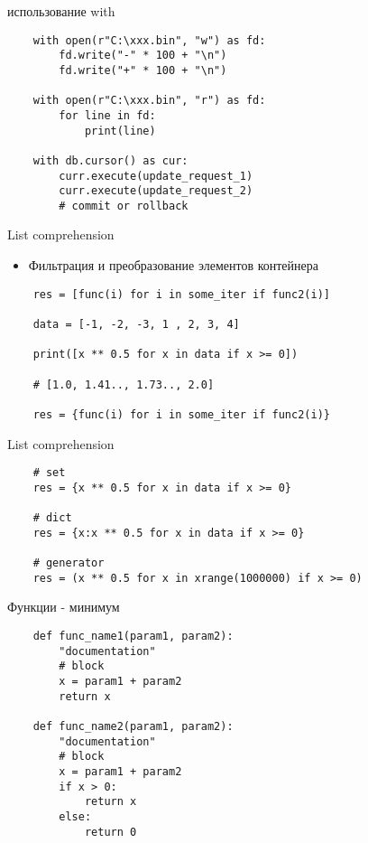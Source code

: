 \documentclass{article}
\begin{document}
\begin{center} использование with \end{center}
\vspace{15pt}
\begin{lstlisting}
	with open(r"C:\xxx.bin", "w") as fd:
	    fd.write("-" * 100 + "\n")
	    fd.write("+" * 100 + "\n")

	with open(r"C:\xxx.bin", "r") as fd:
	    for line in fd:
	    	print(line)

	with db.cursor() as cur:
	    curr.execute(update_request_1)
	    curr.execute(update_request_2)
		# commit or rollback
\end{lstlisting}
\newpage

\begin{center} List comprehension \end{center}
\vspace{15pt}
\begin{itemize}
	\item Фильтрация и преобразование элементов контейнера
\end{itemize}
\begin{lstlisting}
	res = [func(i) for i in some_iter if func2(i)]

	data = [-1, -2, -3, 1 , 2, 3, 4]

	print([x ** 0.5 for x in data if x >= 0])

	# [1.0, 1.41.., 1.73.., 2.0]

	res = {func(i) for i in some_iter if func2(i)}
\end{lstlisting}
\newpage

\begin{center} List comprehension \end{center}
\begin{lstlisting}
	# set
	res = {x ** 0.5 for x in data if x >= 0}

	# dict
	res = {x:x ** 0.5 for x in data if x >= 0}

	# generator
	res = (x ** 0.5 for x in xrange(1000000) if x >= 0)
\end{lstlisting}
\newpage

\begin{center} Функции - минимум \end{center}
\begin{lstlisting}
	def func_name1(param1, param2):
		"documentation"
		# block
		x = param1 + param2
		return x

	def func_name2(param1, param2):
		"documentation"
		# block
		x = param1 + param2
		if x > 0:
			return x
		else:
			return 0
\end{lstlisting}
\newpage
\end{document}
